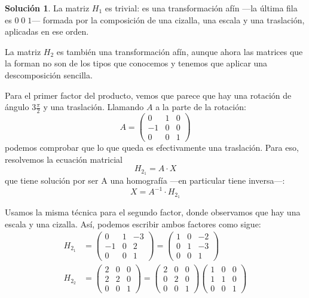 \documentclass[a4paper, 11pt]{article}
\theoremstyle{definition}
\newtheorem*{solucion}{Solución}
\theoremstyle{theorem}
\begin{document}
  \begin{solucion}
      La matriz $H_1$ es trivial: es una transformación afín ---la última fila es $0\;0\;1$--- formada por la composición de una cizalla, una escala y una traslación, aplicadas en ese orden.

      La matriz $H_2$ es también una transformación afín, aunque ahora las matrices que la forman no son de los tipos que conocemos y tenemos que aplicar una descomposición sencilla.

      Para el primer factor del producto, vemos que parece que hay una rotación de ángulo $3\frac{\pi}{2}$ y una traslación. Llamando $A$ a la parte de la rotación:
      \[
      A = \left(
      \begin{array}{ccc}
          0 & 1 & 0 \\
          -1 & 0 & 0 \\
          0 & 0 & 1
      \end{array}
      \right)
      \]
      podemos comprobar que lo que queda es efectivamente una traslación. Para eso, resolvemos la ecuación matricial
      \[
      H_{2_1} = A\cdot X
      \]
      que tiene solución por ser A una homografía ---en particular tiene inversa---:
      \[
      X = A^{-1} \cdot H_{2_1}
      \]

      Usamos la misma técnica para el segundo factor, donde observamos que hay una escala y una cizalla. Así, podemos escribir ambos factores como sigue:
      \begin{align*}
          H_{2_1} &= \left(
          \begin{array}{ccc}
              0 & 1 & -3 \\
              -1 & 0 & 2 \\
              0 & 0 & 1
          \end{array}
          \right) =
          \left(
          \begin{array}{ccc}
              1 & 0 & -2 \\
              0 & 1 & -3 \\
              0 & 0 & 1
          \end{array}
          \right) \\
          H_{2_2} &= \left(
          \begin{array}{ccc}
              2 & 0 & 0 \\
              2 & 2 & 0 \\
              0 & 0 & 1
          \end{array}
          \right) =
          \left(
          \begin{array}{ccc}
              2 & 0 & 0 \\
              0 & 2 & 0 \\
              0 & 0 & 1
          \end{array}
          \right)
          \left(
          \begin{array}{ccc}
              1 & 0 & 0 \\
              1 & 1 & 0 \\
              0 & 0 & 1
          \end{array}
          \right)
      \end{align*}


\end{solucion}
\end{document}
